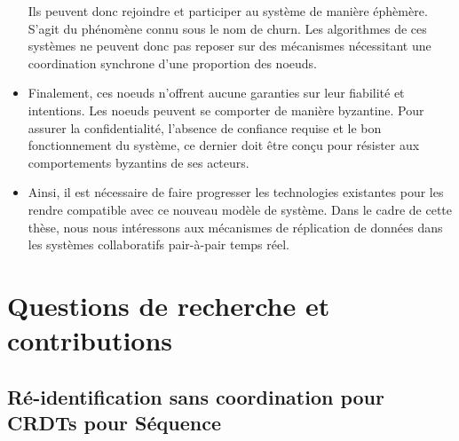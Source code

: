 \documentclass[12pt]{thesul}
\begin{document}
\begin{itemize}
    Ils peuvent donc rejoindre et participer au système de manière éphèmère.
    S'agit du phénomène connu sous le nom de churn.
    Les algorithmes de ces systèmes ne peuvent donc pas reposer sur des mécanismes nécessitant une coordination synchrone d'une proportion des noeuds.
  \item Finalement, ces noeuds n'offrent aucune garanties sur leur fiabilité et intentions.
    Les noeuds peuvent se comporter de manière byzantine.
    Pour assurer la confidentialité, l'absence de confiance requise et le bon fonctionnement du système, ce dernier doit être conçu pour résister aux comportements byzantins de ses acteurs.
  \item Ainsi, il est nécessaire de faire progresser les technologies existantes pour les rendre compatible avec ce nouveau modèle de système.
    Dans le cadre de cette thèse, nous nous intéressons aux mécanismes de réplication de données dans les systèmes collaboratifs pair-à-pair temps réel.
\end{itemize}

\section{Questions de recherche et contributions}

\subsection{Ré-identification sans coordination pour \acp{CRDT} pour Séquence}
\end{document}
